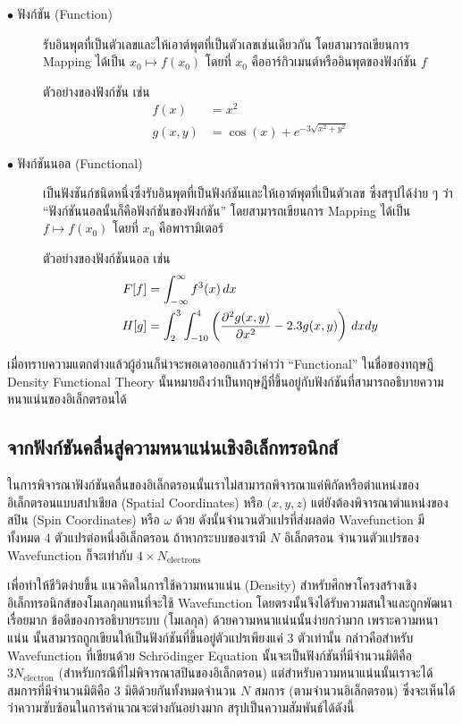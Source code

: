 \begin{description}
    \item[$\bullet$ ฟังก์ชัน (Function)] รับอินพุตที่เป็นตัวเลขและให้เอาต์พุตที่เป็นตัวเลขเช่นเดียวกัน โดยสามารถเขียนการ Mapping 
    ได้เป็น $x_0 \mapsto f(x_0)$ โดยที่ $x_{0}$ คืออาร์กิวเมนต์หรืออินพุตของฟังก์ชัน $f$ 
    
    ตัวอย่างของฟังก์ชัน เช่น
    \begin{align*}
        f(x) &= x^{2} \\
        g(x,y) &= \cos(x) + e^{-3\sqrt{x^{2} + y^{2}}}
    \end{align*}

    \item[$\bullet$ ฟังก์ชันนอล (Functional)] เป็นฟังชันก์ชนิดหนึ่งซึ่งรับอินพุตที่เป็นฟังก์ชันและให้เอาต์พุตที่เป็นตัวเลข ซึ่งสรุปได้ง่าย ๆ 
    ว่า \enquote{ฟังก์ชันนอลนั้นก็คือฟังก์ชันของฟังก์ชัน} โดยสามารถเขียนการ Mapping ได้เป็น $f \mapsto f(x_0)$ โดยที่ $x_{0}$ 
    คือพารามิเตอร์ 
    
    ตัวอย่างของฟังก์ชันนอล เช่น 
    \begin{align*}
        F[f] &= \int^{\infty}_{-\infty} f^{3}(x) \, dx \\
        H[g] &= \int^{3}_{2} \int^{4}_{-10} \left ( \pdv[2]{g(x,y)}{x} - 2.3 g(x,y) \right ) \, dx dy
    \end{align*}
\end{description}

เมื่อทราบความแตกต่างแล้วผู้อ่านก็น่าจะพอเดาออกแล้วว่าคำว่า \enquote{Functional} ในชื่อของทฤษฎี Density Functional Theory 
นั้นหมายถึงว่าเป็นทฤษฎีที่ขึ้นอยู่กับฟังก์ชันที่สามารถอธิบายความหนาแน่นของอิเล็กตรอนได้

\subsection{จากฟังก์ชันคลื่นสู่ความหนาแน่นเชิงอิเล็กทรอนิกส์}
\label{ssec:elec_density}

ในการพิจารณาฟังก์ชันคลื่นของอิเล็กตรอนนั้นเราไม่สามารถพิจารณาแค่พิกัดหรือตำแหน่งของอิเล็กตรอนแบบสปาเชียล (Spatial Coordinates) หรือ
($x, y, z$) แต่ยังต้องพิจารณาตำแหน่งของสปิน (Spin Coordinates) หรือ $\omega$ ด้วย ดังนั้นจำนวนตัวแปรที่ส่งผลต่อ Wavefunction 
มีทั้งหมด 4 ตัวแปรต่อหนึ่งอิเล็กตรอน ถ้าหากระบบของเรามี $N$ อิเล็กตรอน จำนวนตัวแปรของ Wavefunction ก็จะเท่ากับ $4 \times 
N_{\text{electrons}}$

เพื่อทำให้ชีวิตง่ายขึ้น แนวคิดในการใช้ความหนาแน่น (Density) สำหรับศึกษาโครงสร้างเชิงอิเล็กทรอนิกส์ของโมเลกุลแทนที่จะใช้ Wavefunction 
โดยตรงนั้นจึงได้รับความสนใจและถูกพัฒนาเรื่อยมาก ข้อดีของการอธิบายระบบ (โมเลกุล) ด้วยความหนาแน่นนั้นง่ายกว่ามาก เพราะความหนาแน่น%
นั้นสามารถถูกเขียนให้เป็นฟังก์ชันที่ขึ้นอยู่ตัวแปรเพียงแค่ 3 ตัวเท่านั้น กล่าวคือสำหรับ Wavefunction ที่เขียนด้วย Schr\"{o}dinger Equation 
นั้นจะเป็นฟังก์ชันที่มีจำนวนมิติคือ $3N_{\text{electron}}$ (สำหรับกรณีที่ไม่พิจารณาสปินของอิเล็กตรอน) แต่สำหรับความหนาแน่นนั้นเราจะได้%
สมการที่มีจำนวนมิติคือ 3 มิติด้วยกันทั้งหมดจำนวน $N$ สมการ (ตามจำนวนอิเล็กตรอน) ซึ่งจะเห็นได้ว่าความซับซ้อนในการคำนวณจะต่างกันอย่างมาก 
สรุปเป็นความสัมพันธ์ได้ดังนี้

